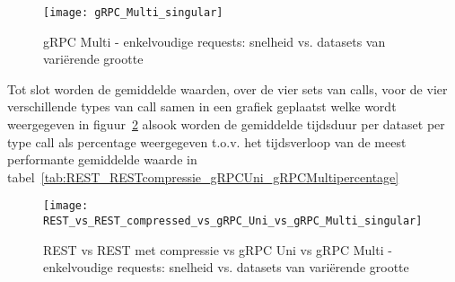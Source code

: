 \begin{figure}[ht]
    \centering
    \texttt{[image: gRPC\_Multi\_singular]}
    \caption{gRPC Multi - enkelvoudige requests: snelheid vs. datasets van vari\"erende grootte}
    \label{fig:gRPCMultienkelvoudig}
\end{figure}

Tot slot worden de gemiddelde waarden, over de vier sets van calls, voor de vier verschillende types van call samen in een grafiek geplaatst
welke wordt weergegeven in figuur~\ref{fig:RESTRESTcompressiegRPCUnigRPCMulti} alsook worden de gemiddelde tijdsduur per dataset per type call
als percentage weergegeven t.o.v. het tijdsverloop van de meest performante gemiddelde waarde in tabel~\ref{tab:REST_RESTcompressie_gRPCUni_gRPCMultipercentage}\\
\begin{figure}[ht]
    \centering
    \texttt{[image: REST\_vs\_REST\_compressed\_vs\_gRPC\_Uni\_vs\_gRPC\_Multi\_singular]}
    \caption{REST vs REST met compressie vs gRPC Uni vs gRPC Multi - enkelvoudige requests: snelheid vs. datasets van vari\"erende grootte}
    \label{fig:RESTRESTcompressiegRPCUnigRPCMulti}
\end{figure}

